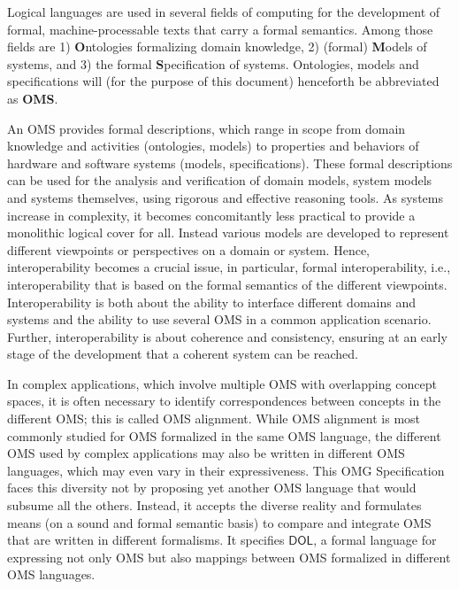 \documentclass[10pt, a4paper]{isov2}
\newcommand*{\IS}{OMG Specification\xspace}
\newcommand*{\DOL}{\ensuremath{\mathsf{DOL}}\xspace}
\begin{document}


Logical languages are used in several fields of computing for the development of formal,
machine-processable texts that carry a formal semantics. Among those fields are 1)
\textbf{O}ntologies
 formalizing domain knowledge, 2) (formal) \textbf{M}odels of systems, and 3) the formal
\textbf{S}pecification
of systems. Ontologies, models  and specifications will (for the purpose of this document)
henceforth be abbreviated as \textbf{OMS}.

An OMS provides formal descriptions, which range in scope from domain knowledge and activities
(ontologies, models) to properties and behaviors of hardware and software systems (models,
specifications). These formal descriptions can be used for the analysis and verification of domain
models, system models and systems themselves, using rigorous and effective reasoning tools.   As
systems increase in complexity, it becomes concomitantly less practical to provide a monolithic
logical cover for all.  Instead various models are developed to represent different viewpoints or
perspectives on a domain or system.
 Hence, interoperability becomes
a crucial issue, in particular, formal interoperability, i.e., interoperability that is based on
the formal semantics of the different viewpoints. Interoperability is both about the ability to
interface different domains and systems and the ability to use several OMS in a common application
scenario. Further,  interoperability is about coherence and consistency, ensuring at an early stage of the development
that a coherent system can be reached.


In complex applications, which involve multiple OMS with overlapping concept spaces,
it is often necessary to identify correspondences between concepts in the different OMS; this is called  OMS alignment.
While OMS alignment is most commonly studied for OMS formalized in the same OMS
language, the different OMS used by complex applications may also be written in different
OMS languages, which may even vary in their expressiveness.
This \IS faces this diversity not by proposing yet another OMS language that would subsume all the others.
Instead, it accepts the diverse reality and formulates means (on a sound and formal semantic basis)
to compare and integrate OMS that are written in different formalisms.
It specifies \DOL, a formal language for
expressing not only OMS but also mappings between OMS formalized in different OMS languages.
\end{document}
